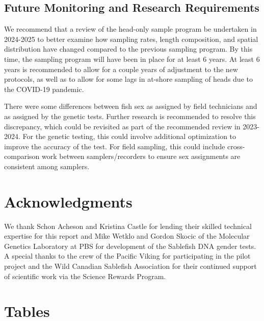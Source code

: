\documentclass[12pt]{article}\usepackage[]{graphicx}\usepackage[]{color}
\begin{document}
\hypertarget{future-monitoring-and-research-requirements}{%
\subsection{Future Monitoring and Research Requirements}\label{future-monitoring-and-research-requirements}}

We recommend that a review of the head-only sample program be undertaken in 2024-2025 to better examine how sampling rates, length composition, and spatial distribution have changed compared to the previous sampling program. By this time, the sampling program will have been in place for at least 6 years. At least 6 years is recommended to allow for a couple years of adjustment to the new protocols, as well as to allow for some lags in at-shore sampling of heads due to the COVID-19 pandemic.

There were some differences between fish sex as assigned by field technicians and as assigned by the genetic tests. Further research is recommended to resolve this discrepancy, which could be revisited as part of the recommended review in 2023-2024. For the genetic testing, this could involve additional optimization to improve the accuracy of the test. For field sampling, this could include cross-comparison work between samplers/recorders to ensure sex assignments are consistent among samplers.

\hypertarget{acknowledgments}{%
\section{Acknowledgments}\label{acknowledgments}}

We thank Schon Acheson and Kristina Castle for lending their skilled technical expertise for this report and Mike Wetklo and Gordon Skocic of the Molecular Genetics Laboratory at PBS for development of the Sablefish DNA gender tests. A special thanks to the crew of the Pacific Viking for participating in the pilot project and the Wild Canadian Sablefish Association for their continued support of scientific work via the Science Rewards Program.

\clearpage

\hypertarget{tables}{%
\section{Tables}\label{tables}}
\end{document}
